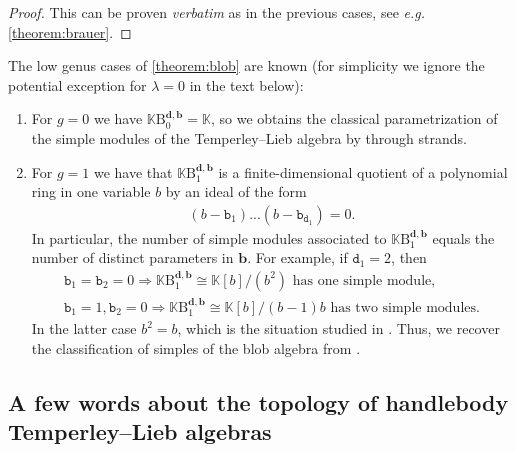\documentclass[a4paper,11pt]{amsart}
\newcommand{\eg}{\textsl{e.g.}}
\newcommand{\ver}{\textsl{verbatim}}
\renewcommand{\dots}{\text{...}}
\newcommand{\setstuff}[1]{\mathrm{#1}}
\newcommand{\K}{\mathbb{K}}
\newcommand{\bsym}[1]{\boldsymbol{#1}}
\newcommand{\varsym}[1]{\mathtt{#1}}
\newcommand{\bpar}{\bsym{b}}
\newcommand{\bvar}{\varsym{b}}
\newcommand{\dpar}{\bsym{d}}
\newcommand{\dvar}{\varsym{d}}
\numberwithin{equation}{section}
\let\fullref\autoref
\begin{document}
\begin{proof}
This can be proven {\ver} as in the previous cases, see {\eg} 
\fullref{theorem:brauer}.
\end{proof}

\begin{example}
The low genus cases of \fullref{theorem:blob} are known 
(for simplicity we ignore the potential exception 
for $\lambda=0$ in the text below):	

\begin{enumerate}

\item For $g=0$ we have $\K\setstuff{B}_{0}^{\dpar,\bpar}=\K$, so we obtains 
the classical parametrization of the simple modules of 
the Temperley--Lieb algebra by through strands.

\item For $g=1$ we have that $\K\setstuff{B}_{1}^{\dpar,\bpar}$ is 
a finite-dimensional quotient of a polynomial ring in one variable $b$
by an ideal of the form
\begin{gather*}
(b-\bvar_{1})
\dots
(b-\bvar_{\dvar_{1}})=0.
\end{gather*} 
In particular, the number of simple modules associated to 
$\K\setstuff{B}_{1}^{\dpar,\bpar}$ equals the number of distinct 
parameters in $\bpar$. For example, if $\dvar_{1}=2$, then
\begin{gather*}
\bvar_{1}=\bvar_{2}=0\Rightarrow
\K\setstuff{B}_{1}^{\dpar,\bpar}\cong\K[b]/(b^{2})
\text{ has one simple module},
\\
\bvar_{1}=1,\bvar_{2}=0\Rightarrow
\K\setstuff{B}_{1}^{\dpar,\bpar}\cong\K[b]/(b-1)b
\text{ has two simple modules}.
\end{gather*}
In the latter case $b^{2}=b$, 
which is the situation studied in \cite{MaSa-blob}.
Thus, we recover the classification of simples of the blob 
algebra from \cite{MaSa-blob}.
\end{enumerate}

\end{example}

\subsection{A few words about the topology of handlebody Temperley--Lieb algebras}\label{subsection:handlebody-tl-topology}
\end{document}

